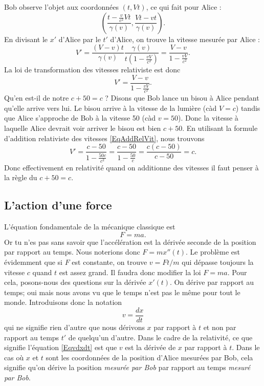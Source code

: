Bob observe l'objet aux coordonnées $(t,Vt)$, ce qui fait pour Alice :
\[ 
  \left( \frac{ t-\frac{ v }{ c^2 }Vt }{ \gamma(v) },\frac{ Vt-vt }{ \gamma(v) } \right).
\]
En divisant le $x'$ d'Alice par le $t'$ d'Alice, on trouve la vitesse mesurée par Alice :
\[ 
  V'=\frac{ (V-v)t }{ \gamma(v) }\frac{ \gamma(v) }{ t\left( 1-\frac{ vV }{ c^2 } \right) }=\frac{ V-v }{ 1-\frac{ vV }{ c^2 } }.
\]
La loi de transformation des vitesses relativiste est donc
\begin{equation}	\label{EqAddRelVit}
V'=\frac{ V-v }{ 1-\frac{ vV }{ c^2 } }.
\end{equation}
Qu'en est-il de notre $c+50=c$ ? Disons que Bob lance un bisou à Alice pendant qu'elle arrive vers lui. Le bisou arrive à la vitesse de la lumière (càd $V=c$) tandis que Alice s'approche de Bob à la vitesse \unit{50}{\meter\per\second} (càd $v=50$). Donc la vitesse à laquelle Alice devrait voir arriver le bisou est bien $c+50$. En utilisant la formule d'addition relativiste des vitesses \eqref{EqAddRelVit}, nous trouvons
\[ 
  V'=\frac{ c-50 }{ 1-\frac{ 50c }{ c^2 } }=\frac{ c-50 }{ 1-\frac{ 50 }{ c } }=\frac{ c(c-50) }{ c-50 }=c.
\]
Donc effectivement en relativité quand on additionne des vitesses il faut penser à la règle du \og $c+50=c$\fg.

\subsection{L'action d'une force}

L'équation fondamentale de la mécanique classique est 
\[ 
  F=ma.
\]
Or tu n'es pas sans savoir que l'accélération est la dérivée seconde de la position par rapport au temps. Nous noterions donc $F=mx''(t)$. Le problème est évidemment que si $F$ est constante, on trouve $v=Ft/m$ qui dépasse toujours la vitesse $c$ quand $t$ est assez grand. Il faudra donc modifier la loi $F=ma$. Pour cela, posons-nous des questions sur la dérivée $x'(t)$. On dérive par rapport au temps; oui mais nous avons vu que le temps n'est pas le même pour tout le monde. Introduisons donc la notation
\begin{equation}	\label{Eqvdxdt}
  v=\frac{ dx }{ dt }
\end{equation}
qui ne signifie rien d'autre que nous dérivons $x$ par rapport à $t$ et non par rapport au temps $t'$ de quelqu'un d'autre. Dans le cadre de la relativité, ce que signifie l'équation \eqref{Eqvdxdt} est que $v$ est la dérivée de $x$ par rapport à $t$. Dans le cas où $x$ et $t$ sont les coordonnées de la position d'Alice mesurées par Bob, cela signifie qu'on dérive la position \emph{mesurée par Bob} par rapport au temps \emph{mesuré par Bob}.

